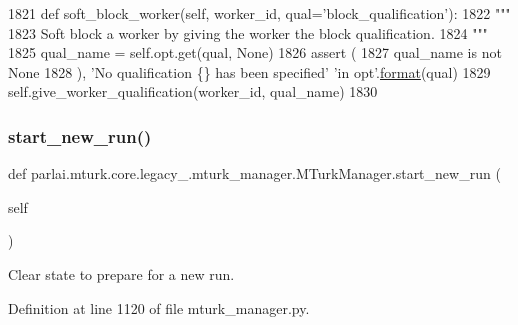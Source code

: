\begin{DoxyCode}
1821     \textcolor{keyword}{def }soft\_block\_worker(self, worker\_id, qual='block\_qualification'):
1822         \textcolor{stringliteral}{"""}
1823 \textcolor{stringliteral}{        Soft block a worker by giving the worker the block qualification.}
1824 \textcolor{stringliteral}{        """}
1825         qual\_name = self.opt.get(qual, \textcolor{keywordtype}{None})
1826         \textcolor{keyword}{assert} (
1827             qual\_name \textcolor{keywordflow}{is} \textcolor{keywordflow}{not} \textcolor{keywordtype}{None}
1828         ), \textcolor{stringliteral}{'No qualification \{\} has been specified'} \textcolor{stringliteral}{'in opt'}.\hyperlink{namespaceparlai_1_1chat__service_1_1services_1_1messenger_1_1shared__utils_a32e2e2022b824fbaf80c747160b52a76}{format}(qual)
1829         self.give\_worker\_qualification(worker\_id, qual\_name)
1830 
\end{DoxyCode}
\mbox{\label{classparlai_1_1mturk_1_1core_1_1legacy__2018_1_1mturk__manager_1_1MTurkManager_a505a28d4b39ae977a72a73ce726cbe14}} 
\subsubsection{\texorpdfstring{start\+\_\+new\+\_\+run()}{start\_new\_run()}}
{\footnotesize\ttfamily def parlai.\+mturk.\+core.\+legacy\+\_.\+mturk\+\_\+manager.\+M\+Turk\+Manager.\+start\+\_\+new\+\_\+run (\begin{DoxyParamCaption}\item[{}]{self }\end{DoxyParamCaption})}

\begin{DoxyVerb}Clear state to prepare for a new run.
\end{DoxyVerb}
 

Definition at line 1120 of file mturk\+\_\+manager.\+py.



